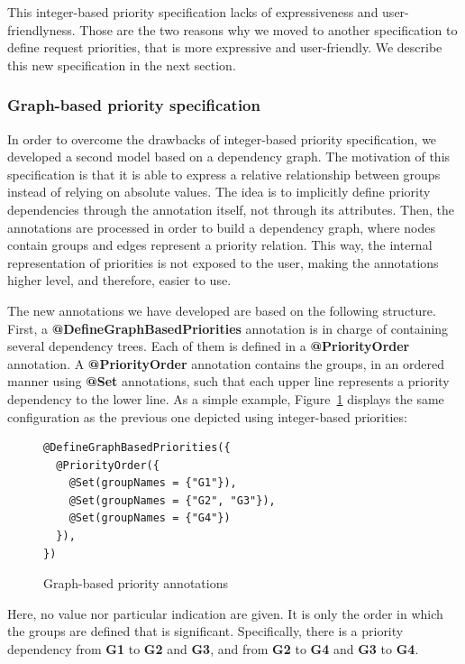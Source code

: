 \documentclass[11pt]{report}
\begin{document}
This integer-based priority specification lacks of expressiveness and user-friendlyness. Those are the two reasons why we moved to another specification to define request priorities, that is more expressive and user-friendly. We describe this new specification in the next section.
 
\subsubsection{Graph-based priority specification}
In order to overcome the drawbacks of integer-based priority specification, we developed a second model based on a dependency graph. The motivation of this specification is that it is able to express a relative relationship between groups instead of relying on absolute values. The idea is to implicitly define priority dependencies through the annotation itself, not through its attributes. Then, the annotations are processed in order to build a dependency graph, where nodes contain groups and edges represent a priority relation. This way, the internal representation of priorities is not exposed to the user, making the annotations higher level, and therefore, easier to use.

The new annotations we have developed are based on the following structure. First, a \textbf{@DefineGraphBasedPriorities} annotation is in charge of containing several dependency trees. Each of them is defined in a \textbf{@PriorityOrder} annotation. A \textbf{@PriorityOrder} annotation contains the groups, in an ordered manner using \textbf{@Set} annotations, such that each upper line represents a priority dependency to the lower line. As a simple example, Figure~\ref{graph_priority_annotation} displays the same configuration as the previous one depicted using integer-based priorities:

\begin{figure}[!ht]
	\lstset{language=java, numbers=left, numberstyle=\tiny, stepnumber=1, numbersep=5pt, basicstyle=\footnotesize}
	\begin{lstlisting}[frame=single]
@DefineGraphBasedPriorities({
  @PriorityOrder({
    @Set(groupNames = {"G1"}),
    @Set(groupNames = {"G2", "G3"}),
    @Set(groupNames = {"G4"})
  }),
})
 	\end{lstlisting}
\caption{Graph-based priority annotations}
\label{graph_priority_annotation}
\end{figure}

Here, no value nor particular indication are given. It is only the order in which the groups are defined that is significant. Specifically, there is a priority dependency from \textbf{G1} to \textbf{G2} and \textbf{G3}, and from \textbf{G2} to \textbf{G4} and \textbf{G3} to \textbf{G4}.
\end{document}
